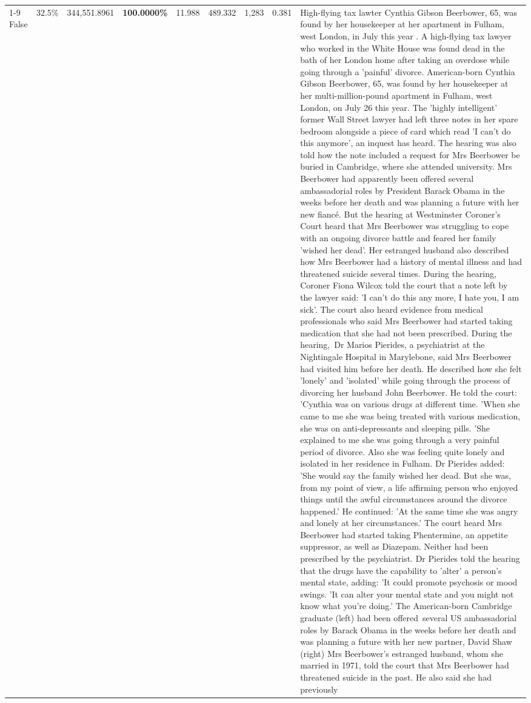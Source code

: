 \begin{table}[H]
\begin{tabular}{lllrlllll}
\cline{1-9}
False & 32.5\% & 344,551.8961 & \bfseries \color{red} 100.0000\% & 11.988 & 489.332 & 1,283 & 0.381 & High-flying tax lawter Cynthia Gibson Beerbower, 65, was found by her housekeeper at her apartment in Fulham, west London, in July this year . A high-flying tax lawyer who worked in the White House was found dead in the bath of her London home after taking an overdose while going through a 'painful' divorce. American-born Cynthia Gibson Beerbower, 65, was found by her housekeeper at her multi-million-pound apartment in Fulham, west London, on July 26 this year. The 'highly intelligent' former Wall Street lawyer had left three notes in her spare bedroom alongside a piece of card which read 'I can't do this anymore', an inquest has heard. The hearing was also told how the note included a request for Mrs Beerbower be buried in Cambridge, where she attended university. Mrs Beerbower had apparently been offered several ambassadorial roles by President Barack Obama in the weeks before her death and was planning a future with her new fiancé. But the hearing at Westminster Coroner's Court heard that Mrs Beerbower was struggling to cope with an ongoing divorce battle and feared her family 'wished her dead'. Her estranged husband also described how Mrs Beerbower had a history of mental illness and had threatened suicide several times. During the hearing, Coroner Fiona Wilcox told the court that a note left by the lawyer said: 'I can't do this any more, I hate you, I am sick'. The court also heard evidence from medical professionals who said Mrs Beerbower had started taking medication that she had not been prescribed. During the hearing, Dr Marios Pierides, a psychiatrist at the Nightingale Hospital in Marylebone, said Mrs Beerbower had visited him before her death. He described how she felt 'lonely' and 'isolated' while going through the process of divorcing her husband John Beerbower. He told the court: 'Cynthia was on various drugs at different time. 'When she came to me she was being treated with various medication, she was on anti-depressants and sleeping pills. 'She explained to me she was going through a very painful period of divorce. Also she was feeling quite lonely and isolated in her residence in Fulham. Dr Pierides added: 'She would say the family wished her dead. But she was, from my point of view, a life affirming person who enjoyed things until the awful circumstances around the divorce happened.' He continued: 'At the same time she was angry and lonely at her circumstances.' The court heard Mrs Beerbower had started taking Phentermine, an appetite suppressor, as well as Diazepam. Neither had been prescribed by the psychiatrist. Dr Pierides told the hearing that the drugs have the capability to 'alter' a person's mental state, adding: 'It could promote psychosis or mood swings. 'It can alter your mental state and you might not know what you're doing.' The American-born Cambridge graduate (left) had been offered several US ambassadorial roles by Barack Obama in the weeks before her death and was planning a future with her new partner, David Shaw (right) Mrs Beerbower's estranged husband, whom she married in 1971, told the court that Mrs Beerbower had threatened suicide in the past. He also said she had previously 
\end{tabular}
\end{table}
